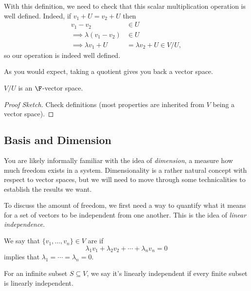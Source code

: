 \documentclass[a4paper]{scrartcl}
\begin{document}
With this definition, we need to check that this scalar multiplication operation 
is well defined. Indeed, if $v_1 + U = v_2 + U$ then
\begin{align*}
    v_1 - v_2 &\in U \\
\implies \lambda(v_1 - v_2) &\in U \\
\implies \lambda v_1 + U &= \lambda v_2 + U \in V/U,
\end{align*}
so our operation is indeed well defined.

As you would expect, taking a quotient gives you back a vector space.

\begin{proposition}
    $V/U$ is an $\F$-vector space.
\end{proposition}
\begin{proof}[Proof Sketch]
    Check definitions (most properties are inherited from $V$ being a vector space).
\end{proof}


\subsection{Basis and Dimension}

You are likely informally familiar with the idea of \emph{dimension}, a measure how much freedom exists in a system. Dimensionality is a rather natural concept with respect to vector spaces, but we will need to move through some technicalities to establish the results we want.

To discuss the amount of freedom, we first need a way to quantify what it means for a set of vectors to be independent from one another. This is the idea of \emph{linear independence}.


\begin{definition}
We say that $\{v_1, \dots, v_n\} \in V$ are  if
$$
\lambda_1 v_1 + \lambda_2 v_2 + \cdots + \lambda_n v_n = 0
$$
implies that $\lambda_1 = \cdots = \lambda_n = 0$.
\end{definition}

\begin{remark}
    For an infinite subset $S \subseteq V$, we say it's linearly independent if every finite subset is linearly independent.
\end{remark}
\end{document}
